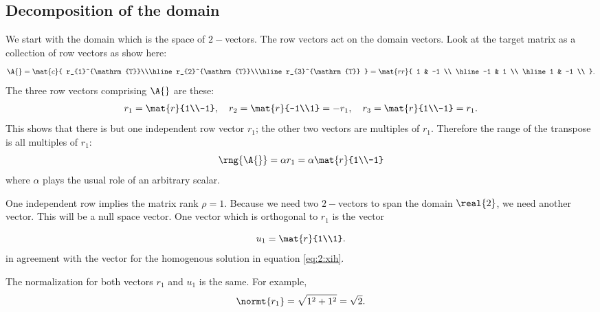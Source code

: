 \subsection{Decomposition of the domain}\label{domain}
We start with the domain which is the space of $2-$vectors. The row vectors act on the domain vectors. Look at the target matrix as a collection of row vectors as show here: 
\begin{equation}
  \A{} = \mat{c}
  {
  r_{1}^{\mathrm{T}}\\\hline
  r_{2}^{\mathrm{T}}\\\hline
  r_{3}^{\mathrm{T}}
  } 
  =
  \mat{rr}
  {
   1 & -1 \\ \hline
  -1 &  1 \\ \hline
   1 & -1 \\ 
  }.
\end{equation}
The three row vectors comprising $\A{}$ are these:
\begin{equation}
  \begin{split}
    r_{1} &= \mat{r}{1\\-1}, \quad
    r_{2} = \mat{r}{-1\\1} = -r_{1}, \quad
    r_{3} = \mat{r}{1\\-1} =  r_{1}.\\
  \end{split}
\end{equation}
This shows that there is but one independent row vector $r_{1}$; the other two vectors are multiples of $r_{1}$. Therefore the range of the transpose is all multiples of $r_{1}$:
\begin{equation}
  \rng{\A{}} = \alpha r_{1} = \alpha \mat{r}{1\\-1}
\end{equation}
where $\alpha$ plays the usual role of an arbitrary scalar.

One independent row implies the matrix rank $\rho = 1$. Because we need two $2-$vectors to span the domain $\real{2}$, we need another vector. This will be a null space vector. One vector which is orthogonal to $r_{1}$ is the vector

\begin{equation}
 u_{1} = \mat{r}{1\\1}.
\end{equation}
in agreement with the vector for the homogenous solution in equation \eqref{eq:2:xih}. 

The normalization for both vectors $r_{1}$ and $u_{1}$ is the same. For example,
\begin{equation}
  \normt{r_{1}} = \sqrt{1^{2}+1^{2}} = \sqrt{2}.
\end{equation}

